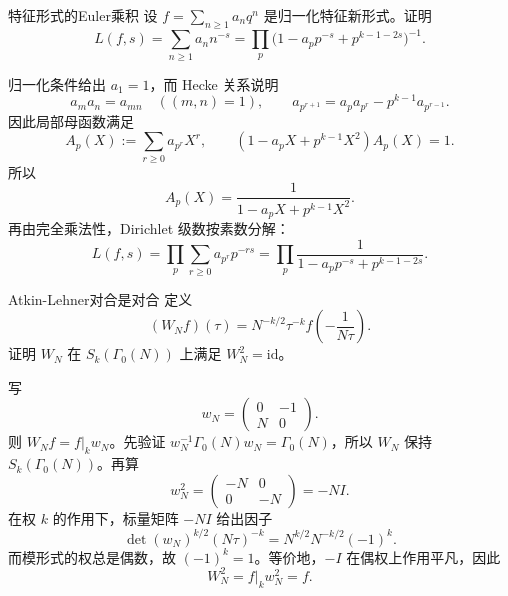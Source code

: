 \begin{problem}{特征形式的Euler乘积}
设 $f=\sum_{n\ge1}a_nq^n$ 是归一化特征新形式。证明
\[
L(f,s)=\sum_{n\ge1}a_nn^{-s}=\prod_p\bigl(1-a_pp^{-s}+p^{k-1-2s}\bigr)^{-1}.
\]
\end{problem}
\begin{solution}
归一化条件给出 $a_1=1$，而 Hecke 关系说明
\[
a_ma_n=a_{mn}\quad ((m,n)=1),
\qquad
 a_{p^{r+1}}=a_pa_{p^r}-p^{k-1}a_{p^{r-1}}.
\]
因此局部母函数满足
\[
A_p(X):=\sum_{r\ge0}a_{p^r}X^r,
\qquad
(1-a_pX+p^{k-1}X^2)A_p(X)=1.
\]
所以
\[
A_p(X)=\frac1{1-a_pX+p^{k-1}X^2}.
\]
再由完全乘法性，Dirichlet 级数按素数分解：
\[
L(f,s)=\prod_p\sum_{r\ge0}a_{p^r}p^{-rs}
=\prod_p\frac1{1-a_pp^{-s}+p^{k-1-2s}}.
\]
\end{solution}

\begin{problem}{Atkin-Lehner对合是对合}
定义
\[
(W_Nf)(\tau)=N^{-k/2}\tau^{-k}f\!\left(-\frac1{N\tau}\right).
\]
证明 $W_N$ 在 $S_k(\Gamma_0(N))$ 上满足 $W_N^2=\mathrm{id}$。
\end{problem}
\begin{solution}
写
\[
w_N=\begin{pmatrix}0&-1\\N&0\end{pmatrix}.
\]
则 $W_Nf=f|_kw_N$。先验证 $w_N^{-1}\Gamma_0(N)w_N=\Gamma_0(N)$，所以 $W_N$ 保持 $S_k(\Gamma_0(N))$。再算
\[
w_N^2=\begin{pmatrix}-N&0\\0&-N\end{pmatrix}=-NI.
\]
在权 $k$ 的作用下，标量矩阵 $-NI$ 给出因子
\[
\det(w_N)^{k/2}(N\tau)^{-k}=N^{k/2}N^{-k/2}(-1)^k.
\]
而模形式的权总是偶数，故 $(-1)^k=1$。等价地，$-I$ 在偶权上作用平凡，因此
\[
W_N^2=f|_kw_N^2=f.
\]
\end{solution}

